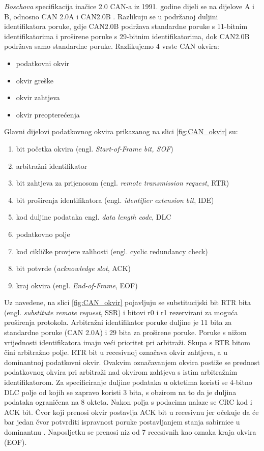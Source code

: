\documentclass[times, utf8, diplomski, numeric]{fer}
\begin{document}
\textit{Boschova} specifikacija inačice 2.0 CAN-a iz 1991. godine dijeli se na dijelove A i B, odnosno CAN 2.0A i CAN2.0B \cite{bosch1991}. Razlikuju se u podržanoj duljini identifikatora poruke, gdje CAN2.0B podržava standardne poruke s 11-bitnim identifikatorima i proširene poruke s 29-bitnim identifikatorima, dok CAN2.0B podržava samo standardne poruke. Razlikujemo 4 vrste CAN okvira:
\begin{itemize}
    \item podatkovni okvir 
    \item okvir greške 
    \item okvir zahtjeva 
    \item okvir preopterećenja 
\end{itemize}
\newpage
Glavni dijelovi podatkovnog okvira prikazanog na slici \ref{fig:CAN_okvir} su:
\begin{enumerate}
    \item bit početka okvira (engl. \textit{Start-of-Frame bit, SOF})    
    \item arbitražni identifikator     
    \item bit zahtjeva za prijenosom (engl. \textit{remote transmission request}, RTR) 
    \item bit proširenja identifikatora (engl. \textit{identifier extension bit}, IDE) 
    \item kod duljine podataka {engl. \textit{data length code}, DLC}
    \item podatkovno polje        
    \item kod cikličke provjere zalihosti (engl. cyclic redundancy check)
    \item bit potvrde (\textit{acknowledge slot}, ACK)
    \item kraj okvira (engl. \textit{End-of-Frame}, EOF)        
\end{enumerate}

Uz navedene, na slici \ref{fig:CAN_okvir} pojavljuju se substitucijski bit RTR bita (engl. \textit{substitute remote request}, SSR) i bitovi r0 i r1 rezervirani za moguća proširenja protokola.
Arbitražni identifikator poruke duljine je 11 bita za standardne poruke (CAN 2.0A) i 29 bita za proširene poruke. Poruke s nižom vrijednosti identifikatora imaju veći prioritet pri arbitraži. Skupa s RTR bitom čini arbitražno polje. RTR bit u recesivnoj \grqq označava okvir zahtjeva, a u dominantnoj \grqq podatkovni okvir. Ovakvim označavanjem okvira postiže se prednost podatkovnog okvira pri arbitraži nad okvirom zahtjeva s istim arbitražnim identifikatorom. Za specificiranje duljine podataka u oktetima koristi se 4-bitno DLC polje od kojih se zapravo koristi 3 bita, s obzirom na to da je duljina podataka ograničena na 8 okteta. Nakon polja s podacima nalaze se CRC kod i ACK bit. Čvor koji prenosi okvir postavlja ACK bit u recesivnu \grqq jer očekuje da će bar jedan čvor potvrditi ispravnost poruke postavljanjem stanja sabirnice u dominantnu \grqq. Naposljetku se prenosi niz od 7 recesivnih \grqq kao oznaka kraja okvira (EOF).
\end{document}
